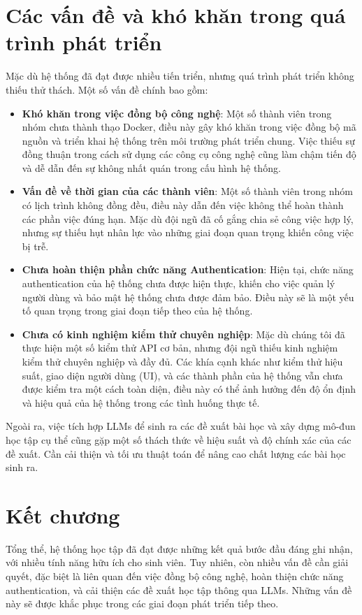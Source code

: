 \section{Các vấn đề và khó khăn trong quá trình phát triển}

Mặc dù hệ thống đã đạt được nhiều tiến triển, nhưng quá trình phát triển không thiếu thử thách. Một số vấn đề chính bao gồm:

\begin{itemize}
    \item \textbf{Khó khăn trong việc đồng bộ công nghệ}: Một số thành viên trong nhóm chưa thành thạo Docker, điều này gây khó khăn trong việc đồng bộ mã nguồn và triển khai hệ thống trên môi trường phát triển chung. Việc thiếu sự đồng thuận trong cách sử dụng các công cụ công nghệ cũng làm chậm tiến độ và dễ dẫn đến sự không nhất quán trong cấu hình hệ thống.
    \item \textbf{Vấn đề về thời gian của các thành viên}: Một số thành viên trong nhóm có lịch trình không đồng đều, điều này dẫn đến việc không thể hoàn thành các phần việc đúng hạn. Mặc dù đội ngũ đã cố gắng chia sẻ công việc hợp lý, nhưng sự thiếu hụt nhân lực vào những giai đoạn quan trọng khiến công việc bị trễ.
    \item \textbf{Chưa hoàn thiện phần chức năng Authentication}: Hiện tại, chức năng authentication của hệ thống chưa được hiện thực, khiến cho việc quản lý người dùng và bảo mật hệ thống chưa được đảm bảo. Điều này sẽ là một yếu tố quan trọng trong giai đoạn tiếp theo của hệ thống.
    \item \textbf{Chưa có kinh nghiệm kiểm thử chuyên nghiệp}: Mặc dù chúng tôi đã thực hiện một số kiểm thử API cơ bản, nhưng đội ngũ thiếu kinh nghiệm kiểm thử chuyên nghiệp và đầy đủ. Các khía cạnh khác như kiểm thử hiệu suất, giao diện người dùng (UI), và các thành phần của hệ thống vẫn chưa được kiểm tra một cách toàn diện, điều này có thể ảnh hưởng đến độ ổn định và hiệu quả của hệ thống trong các tình huống thực tế.
\end{itemize}

Ngoài ra, việc tích hợp LLMs để sinh ra các đề xuất bài học và xây dựng mô-đun học tập cụ thể cũng gặp một số thách thức về hiệu suất và độ chính xác của các đề xuất. Cần cải thiện và tối ưu thuật toán để nâng cao chất lượng các bài học sinh ra.

\section{Kết chương}

Tổng thể, hệ thống học tập đã đạt được những kết quả bước đầu đáng ghi nhận, với nhiều tính năng hữu ích cho sinh viên. Tuy nhiên, còn nhiều vấn đề cần giải quyết, đặc biệt là liên quan đến việc đồng bộ công nghệ, hoàn thiện chức năng authentication, và cải thiện các đề xuất học tập thông qua LLMs. Những vấn đề này sẽ được khắc phục trong các giai đoạn phát triển tiếp theo.


